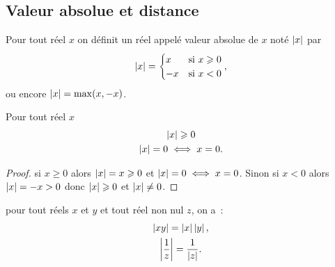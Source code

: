 \subsection{Valeur absolue et distance}

\begin{defdef}
  Pour tout réel \(x\) on définit un réel appelé valeur absolue de \(x\) noté 
  \(\left\lvert x\right\rvert\) par
  \begin{equation}
    \left\lvert x\right\rvert = \begin{cases} x & \text{si } x\geqslant 0 \\ -x & \text{si } x < 0
    \end{cases},
    \end{equation}
    ou encore \(\left\lvert x\right\rvert = \max(x, - x)\).
  \end{defdef}

  \begin{prop}
    Pour tout réel \(x\)
    \begin{gather}
      \left\lvert x\right\rvert\geqslant 0 \\
      \left\lvert x\right\rvert = 0 \iff x = 0.
    \end{gather}
  \end{prop}

  \begin{proof}
    si \(x \geqslant 0\) alors \(\left\lvert x\right\rvert = x \geqslant 0\) et \(\left\lvert x\right\rvert = 0 \iff 
    x = 0\). Sinon si \(x < 0\) alors \(\left\lvert x\right\rvert = -x>0\) donc \(\left\lvert x\right\rvert 
    \geqslant 0\) et \(\left\lvert x\right\rvert \neq 0\).
  \end{proof}

  \begin{prop}
    pour tout réels \(x\) et \(y\) et tout réel non nul \(z\), on a~:
    \begin{gather}
      \left\lvert xy\right\rvert = \left\lvert x\right\rvert\left\lvert y\right\rvert, \\ \left\lvert\frac{1}{z}\right\rvert = \frac{1}{\left\lvert z\right\rvert}.
    \end{gather}
  \end{prop}

